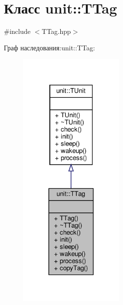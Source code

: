 \hypertarget{classunit_1_1_t_tag}{}\section{Класс unit\+:\+:T\+Tag}
\label{classunit_1_1_t_tag}


{\ttfamily \#include $<$T\+Tag.\+hpp$>$}



Граф наследования\+:unit\+:\+:T\+Tag\+:\nopagebreak
\begin{figure}[H]
\begin{center}
\leavevmode
\includegraphics[width=149pt]{classunit_1_1_t_tag__inherit__graph}
\end{center}
\end{figure}


